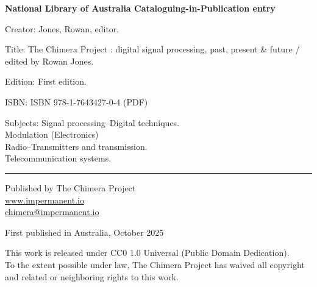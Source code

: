 \newpage
\thispagestyle{empty}

\vspace*{5cm}

\begin{flushleft}

{\small
\textbf{National Library of Australia Cataloguing-in-Publication entry}

\vspace{0.5cm}

Creator: Jones, Rowan, editor.

\vspace{0.3cm}

Title: The Chimera Project : digital signal processing, past, present \& future / edited by Rowan Jones.

\vspace{0.3cm}

Edition: First edition.

\vspace{0.3cm}

ISBN: ISBN 978-1-7643427-0-4 (PDF)

\vspace{0.3cm}

Subjects: Signal processing--Digital techniques.\\
\hspace*{2em}Modulation (Electronics)\\
\hspace*{2em}Radio--Transmitters and transmission.\\
\hspace*{2em}Telecommunication systems.

\vspace{1cm}

\rule{0.3\textwidth}{0.4pt}

\vspace{0.5cm}

Published by The Chimera Project\\
\url{www.impermanent.io}\\
\href{mailto:chimera@impermanent.io}{chimera@impermanent.io}

\vspace{0.5cm}

First published in Australia, October 2025

\vspace{0.5cm}

This work is released under CC0 1.0 Universal (Public Domain Dedication).\\
To the extent possible under law, The Chimera Project has waived all copyright\\
and related or neighboring rights to this work.

}

\end{flushleft}

\newpage
